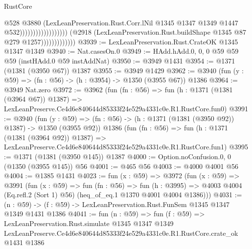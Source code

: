 \begin{lexlean}{RustCore}
\begin{coremodule}
                                                            @528
                                                            @3880
                                                            (LexLeanPreservation.Rust.Corr.lNil
                                                              @1345
                                                              @1347
                                                              @1349
                                                              @1447
                                                              @532))))))))))))))))))
                          (@2918
                            (LexLeanPreservation.Rust.buildShape @1345 @87 @279 @1257)))))))))))))
@3939 := LexLeanPreservation.Rust.CrateOK @1345 @1347 @1349
@3940 := Nat.casesOn.{0}
@3949 := HAdd.hAdd.{0, 0, 0} @59 @59 @59 (instHAdd.{0} @59 instAddNat)
@3950 := @3949 @1431
@3954 := @1371 (@1381 (@3950 @67)) @1387
@3955 := @3949 @1429
@3962 := @3940 (fun (y : @59) => (fn : @56) -> (h : @3954) -> @1350 (@3955 @67)) @1386
@3964 := @3949 Nat.zero
@3972 := @3962
    (fun (fn : @56) =>
    fun (h : @1371 (@1381 (@3964 @67)) @1387) =>
    LexLeanPreserve.Ce4d6e840644d85333f24e529a4331c0e.R1.RustCore.fun0)
@3991 := @3940
    (fun (y : @59) => (fn : @56) -> (h : @1371 (@1381 (@3950 @92)) @1387) -> @1350 (@3955 @92))
    @1386
    (fun (fn : @56) =>
    fun (h : @1371 (@1381 (@3964 @92)) @1387) =>
    LexLeanPreserve.Ce4d6e840644d85333f24e529a4331c0e.R1.RustCore.fun1)
@3995 := @1371 (@1381 (@3950 @145)) @1387
@4000 := Option.noConfusion.{0, 0} (@1350 (@3955 @145)) @56
@4001 := @465 @56
@4003 := @4000 @4001 @56
@4004 := @1385 @1431
@4023 := fun (x : @59) =>
  @3972
    (fun (x : @59) =>
    @3991
      (fun (x : @59) =>
      fun (fn : @56) =>
      fun (h : @3995) =>
      @4003 @4004 (Eq.refl.{2} (Sort 1) @56) (heq_of_eq.{1} @1370 @4001 @4004 @1386)))
@4031 := (n : @59) -> (f : @59) -> LexLeanPreservation.Rust.FunSem @1345 @1347 @1349 @1431 @1386
@4041 := fun (n : @59) =>
  fun (f : @59) =>
  LexLeanPreservation.Rust.simulate
    @1345
    @1347
    @1349
    LexLeanPreserve.Ce4d6e840644d85333f24e529a4331c0e.R1.RustCore.crate_ok
    @1431
    @1386
\end{coremodule}
\end{lexlean}
